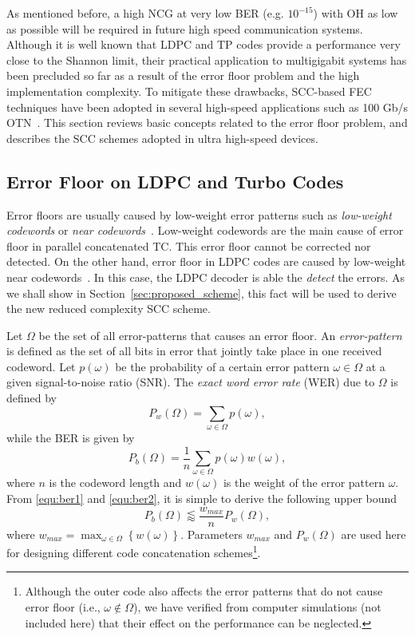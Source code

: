\documentclass[conference]{IEEEtran}
\begin{document}
As mentioned before, a high NCG at very low BER (e.g.  $10^{-15}$)
with OH as low as possible will be required in future high speed
communication systems. Although it is well known that LDPC and TP
codes provide a performance very close to the Shannon limit, their
practical application to multigigabit systems has been precluded so
far as a result of the error floor problem and the high implementation
complexity. To mitigate these drawbacks, SCC-based FEC techniques have
been adopted in several high-speed applications such as 100 Gb/s
OTN~\cite{OSKY2010,KS2010,4528592}. This section reviews basic
concepts related to the error floor problem, and describes the SCC
schemes adopted in ultra high-speed devices.

\subsection{Error Floor on LDPC and Turbo Codes} \label{sec:errorfloor_model}

Error floors are usually caused by low-weight error patterns such as
\emph{low-weight codewords} or \emph{near
  codewords}~\cite{RL2009,R2003}. Low-weight codewords are the main
cause of error floor in parallel concatenated TC. This error floor
cannot be corrected nor detected. On the other hand, error floor in
LDPC codes are caused by low-weight near codewords~\cite{R2003}. In
this case, the LDPC decoder is able the \emph{detect} the errors. As
we shall show in Section~\ref{sec:proposed_scheme}, this fact will be
used to derive the new reduced complexity SCC scheme.

Let $\Omega$ be the set of all error-patterns that causes an error
floor. An \emph{error-pattern} is defined as the set of all bits in
error that jointly take place in one received codeword. Let
$p(\omega)$ be the probability of a certain error pattern $\omega \in
\Omega$ at a given signal-to-noise ratio (SNR). The \textit{exact word
  error rate} (WER) due to $\Omega$ is defined by
\begin{equation}\label{equ:ber1}
  P_w(\Omega) = \sum_{\omega\in\Omega} p(\omega),
\end{equation}
while the BER is given by
\begin{equation}\label{equ:ber2}
  P_b(\Omega) = \frac{1}{n}\sum_{\omega\in\Omega} p(\omega)w(\omega),
\end{equation}
where $n$ is the codeword length and $w(\omega)$ is the weight of the
error pattern $\omega$. From \eqref{equ:ber1} and \eqref{equ:ber2}, it
is simple to derive the following upper bound
\begin{equation}\label{equ:ber3}
  P_b(\Omega) \lessapprox\frac{w_{max}}{n} P_w(\Omega),
\end{equation}
where $w_{max}= \max_{\omega \in \Omega} \left
\{w(\omega)\right\}$. Parameters $w_{max}$ and $P_w(\Omega)$ are used
here for designing different code concatenation
schemes\footnote{Although the outer code also affects the error
  patterns that do not cause error floor (i.e., $\omega\notin\Omega$),
  we have verified from computer simulations (not included here) that
  their effect on the performance can be neglected.}.
\end{document}
